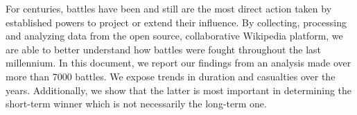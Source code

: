 For centuries, battles have been and still are the most direct action taken by established powers to project or extend their influence. By collecting, processing and analyzing data from the open source, collaborative Wikipedia platform, we are able to better understand how battles were fought throughout the last millennium. In this document, we report our findings from an analysis made over more than 7000 battles. We expose trends in duration and casualties over the years. Additionally, we show that the latter is most important in determining the short-term winner which is not necessarily the long-term one.